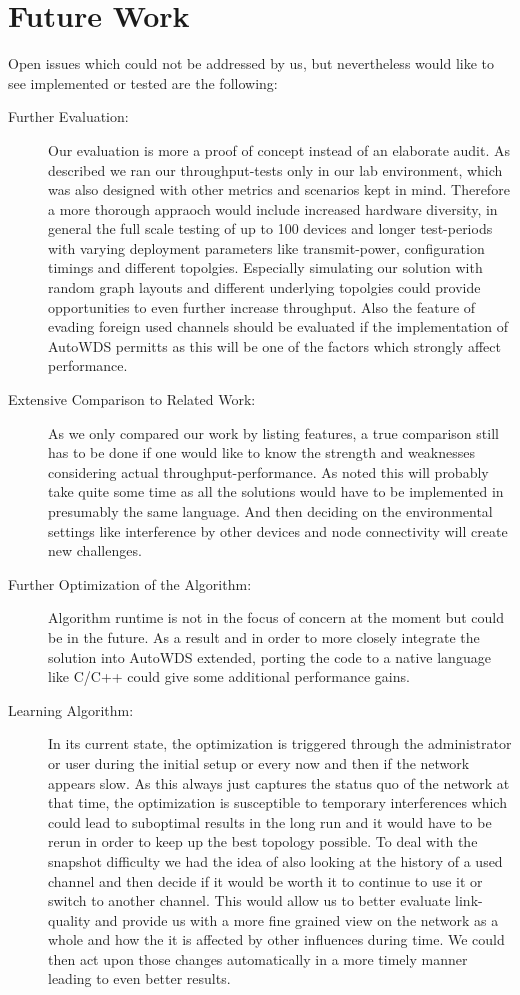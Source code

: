   \section{Future Work}
    Open issues which could not be addressed by us, but nevertheless would like 
    to see implemented or tested are the following:
    \begin{description}
      \item [Further Evaluation:]
	Our evaluation is more a proof of concept instead of an elaborate audit. As described we ran our throughput-tests only in our lab environment, 
	which was also designed with other metrics and scenarios kept in mind. Therefore a more thorough appraoch would include increased hardware diversity, 
	in general the full scale testing of up to 100 devices and longer test-periods with varying deployment parameters like transmit-power, 
	configuration timings and different topolgies.
	Especially simulating our solution with random graph layouts and different underlying topolgies could provide opportunities to even further increase throughput.
	Also the feature of evading foreign used channels should be evaluated if the implementation of 
	AutoWDS permitts as this will be one of the factors which strongly affect performance.
      
      \item[Extensive Comparison to Related Work:]
	As we only compared our work by listing features, a true comparison still has to be done if one would 
	like to know the strength and weaknesses considering actual throughput-performance.
	As noted this will probably take quite some time as all the solutions would have to be 
	implemented in presumably the same language. And then deciding on the environmental settings
	like interference by other devices and node connectivity will create new challenges.
      
      \item[Further Optimization of the Algorithm:]
	Algorithm runtime is not in the focus of concern at the moment but could be in the future. 
	As a result and in order to more closely integrate the solution into AutoWDS extended,
	porting the code to a native language like C/C++ could give some additional performance gains.
      
      \item[Learning Algorithm:]
	In its current state, the optimization is triggered through the administrator or user during the initial setup or every now and then if
	the network appears slow. As this always just captures the status quo of the network at that time, the optimization is susceptible to
	temporary interferences which could lead to suboptimal results in the long run and it would have to be rerun in order to keep up the best topology possible.
	To deal with the snapshot difficulty we had the idea of also looking at the history of a used channel and then decide if it would be worth it to continue
	to use it or switch to another channel. This would allow us to better evaluate link-quality and provide us with a more fine grained view on the network as a whole
	and how the it is affected by other influences during time. 
	We could then act upon those changes automatically in a more timely manner leading to even better results.
	
    \end{description}